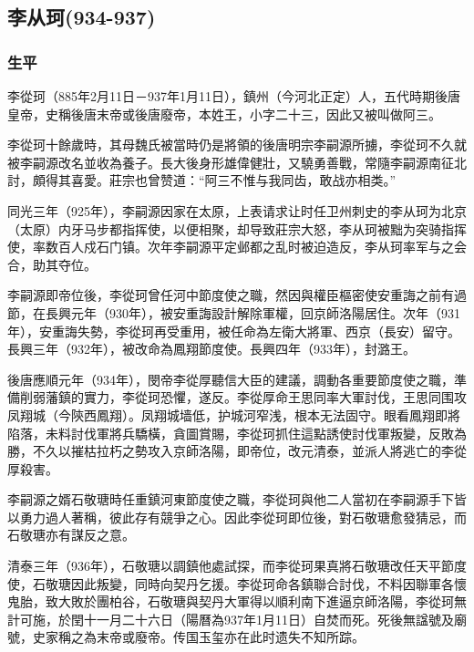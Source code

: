 
\subsection{李从珂\tiny(934-937)}

\subsubsection{生平}

李從珂（885年2月11日－937年1月11日），鎮州（今河北正定）人，五代時期後唐皇帝，史稱後唐末帝或後唐廢帝，本姓王，小字二十三，因此又被叫做阿三。

李從珂十餘歲時，其母魏氏被當時仍是將領的後唐明宗李嗣源所擄，李從珂不久就被李嗣源改名並收為養子。長大後身形雄偉健壯，又驍勇善戰，常隨李嗣源南征北討，頗得其喜愛。莊宗也曾赞道：“阿三不惟与我同齿，敢战亦相类。”

同光三年（925年），李嗣源因家在太原，上表请求让时任卫州刺史的李从珂为北京（太原）内牙马步都指挥使，以便相聚，却导致莊宗大怒，李从珂被黜为突骑指挥使，率数百人戍石门镇。次年李嗣源平定邺都之乱时被迫造反，李从珂率军与之会合，助其夺位。

李嗣源即帝位後，李從珂曾任河中節度使之職，然因與權臣樞密使安重誨之前有過節，在長興元年（930年），被安重誨設計解除軍權，回京師洛陽居住。次年（931年），安重誨失勢，李從珂再受重用，被任命為左衛大將軍、西京（長安）留守。長興三年（932年），被改命為鳳翔節度使。長興四年（933年），封潞王。

後唐應順元年（934年），閔帝李從厚聽信大臣的建議，調動各重要節度使之職，準備削弱藩鎮的實力，李從珂恐懼，遂反。李從厚命王思同率大軍討伐，王思同围攻凤翔城（今陝西鳳翔）。凤翔城墙低，护城河窄浅，根本无法固守。眼看鳳翔即將陷落，未料討伐軍將兵驕橫，貪圖賞賜，李從珂抓住這點誘使討伐軍叛變，反敗為勝，不久以摧枯拉朽之勢攻入京師洛陽，即帝位，改元清泰，並派人將逃亡的李從厚殺害。

李嗣源之婿石敬瑭時任重鎮河東節度使之職，李從珂與他二人當初在李嗣源手下皆以勇力過人著稱，彼此存有競爭之心。因此李從珂即位後，對石敬瑭愈發猜忌，而石敬瑭亦有謀反之意。

清泰三年（936年），石敬瑭以調鎮他處試探，而李從珂果真將石敬瑭改任天平節度使，石敬瑭因此叛變，同時向契丹乞援。李從珂命各鎮聯合討伐，不料因聯軍各懷鬼胎，致大敗於團柏谷，石敬瑭與契丹大軍得以順利南下進逼京師洛陽，李從珂無計可施，於閏十一月二十六日（陽曆為937年1月11日）自焚而死。死後無諡號及廟號，史家稱之為末帝或廢帝。传国玉玺亦在此时遗失不知所踪。

